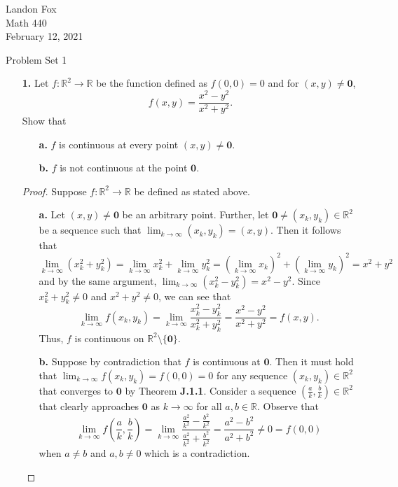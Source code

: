 \documentclass[ 12pt ]{article}
\begin{document}
\noindent Landon Fox \\
\noindent Math 440 \\
\noindent February 12, 2021

\begin{center}
	\Large Problem Set 1
\end{center}

\begin{enumerate}
	\item[\textbf{1.}] Let $f : \mathbb{R}^2 \to \mathbb{R}$ be the function defined as $f(0, 0) = 0$ and for $(x, y) \neq \textbf{0}$, $$f(x, y) = \frac{x^2 - y^2}{x^2 + y^2}.$$ Show
		that
		\begin{enumerate}
			\item[\textbf{a.}] $f$ is continuous at every point $(x, y) \neq \textbf{0}$.
			\item[\textbf{b.}] $f$ is not continuous at the point $\textbf{0}$.
		\end{enumerate}

		\begin{proof}
			Suppose $f : \mathbb{R}^2 \to \mathbb{R}$ be defined as stated above.
			\begin{enumerate}
				\item[\textbf{a.}] Let $(x, y) \neq \textbf{0}$ be an arbitrary point. Further, let $\textbf{0} \neq (x_k, y_k) \in \mathbb{R}^2$ be a sequence such that $\lim_{k \to
					\infty} (x_k, y_k) = (x, y)$. Then it follows that $$\lim_{k \to \infty}(x_k^2 + y_k^2) = \lim_{k \to \infty}x_k^2 + \lim_{k \to \infty}y_k^2 = \left ( \lim_{k \to
					\infty} x_k \right )^2 + \left ( \lim_{k \to \infty} y_k \right )^2 = x^2 + y^2$$ and by the same argument, $\lim_{k \to \infty}(x_k^2 - y_k^2) = x^2 - y^2$. Since
					$x_k^2 + y_k^2 \neq 0$ and $x^2 + y^2 \neq 0$, we can see that $$\lim_{k \to \infty} f(x_k, y_k) = \lim_{k \to \infty} \frac{x_k^2 - y_k^2}{x_k^2 + y_k^2} =
					\frac{x^2 - y^2}{x^2 + y^2} = f(x, y).$$ Thus, $f$ is continuous on $\mathbb{R}^2 \setminus \{ \textbf{0} \}$.

				\item[\textbf{b.}] Suppose by contradiction that $f$ is continuous at $\textbf{0}$. Then it must hold that $\lim_{k \to \infty} f(x_k, y_k) = f(0, 0) = 0$ for any
					sequence $(x_k, y_k) \in \mathbb{R}^2$ that converges to $\textbf{0}$ by Theorem \textbf{J.1.1}. Consider a sequence $\left ( \frac{a}{k}, \frac{b}{k} \right ) \in
					\mathbb{R}^2$ that clearly approaches $\textbf{0}$  as $k \to \infty$ for all $a, b \in \mathbb{R}$. Observe that $$\lim_{k \to \infty} f \left ( \frac{a}{k},
					\frac{b}{k} \right ) = \lim_{k \to \infty} \frac{\frac{a^2}{k^2} - \frac{b^2}{k^2}}{\frac{a^2}{k^2} + \frac{b^2}{k^2}} = \frac{a^2 - b^2}{a^2 + b^2} \neq 0 = f(0,
					0)$$ when $a \neq b$ and $a, b \neq 0$ which is a contradiction.
			\end{enumerate}
		\end{proof}



\end{enumerate}
\end{document}
